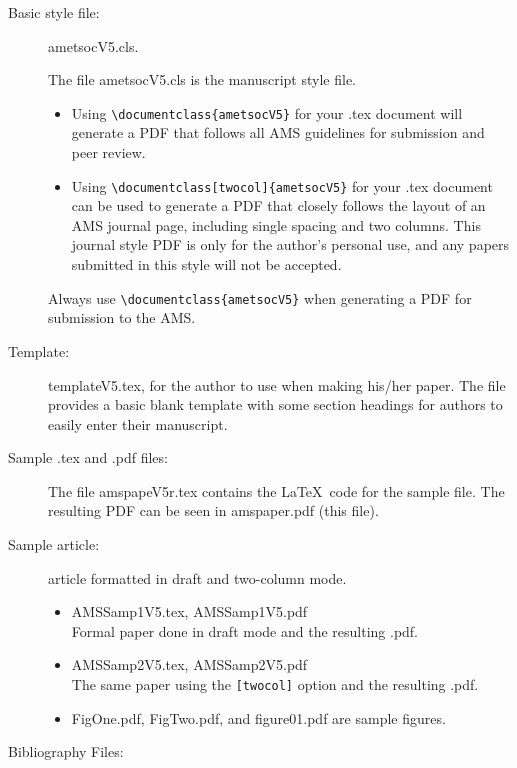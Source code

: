 \documentclass{ametsocV5}
\begin{document}
\begin{description}
\item[Basic style file:] ametsocV5.cls. 

The file ametsocV5.cls is the manuscript style file.  

\begin{itemize}
\item
Using \verb+\documentclass{ametsocV5}+ for your .tex document
will 
generate a PDF that follows all AMS guidelines for submission and peer
review.  

\item
Using \verb+\documentclass[twocol]{ametsocV5}+ for your .tex document
can be used to generate a PDF that closely
follows the layout of an AMS journal page, including single spacing and two
columns.  This journal style PDF is only for the author's personal use, and
any papers submitted in this style will not be accepted.  
\end{itemize}
Always use \verb+\documentclass{ametsocV5}+ 
when generating a PDF for submission to the AMS. 

\item[Template:]
templateV5.tex, for the author to use when making his/her
paper.
The file provides a basic blank template with some
section headings for authors to easily enter their manuscript.

\item[Sample .tex and .pdf files:]
The file amspapeV5r.tex contains the \LaTeX\ code for the sample file.  
The resulting PDF can be seen in amspaper.pdf (this file).


\item[Sample article:] article formatted in draft and two-column mode.

\begin{itemize}
\item
AMSSamp1V5.tex, AMSSamp1V5.pdf\\
Formal paper done in draft mode and the resulting .pdf.

\item
AMSSamp2V5.tex, AMSSamp2V5.pdf \\
The same paper using the \verb+[twocol]+ option and the resulting .pdf.

\item
FigOne.pdf, FigTwo.pdf, and figure01.pdf are sample figures.


\end{itemize}

\item[Bibliography Files:]


\end{description}
\end{document}
